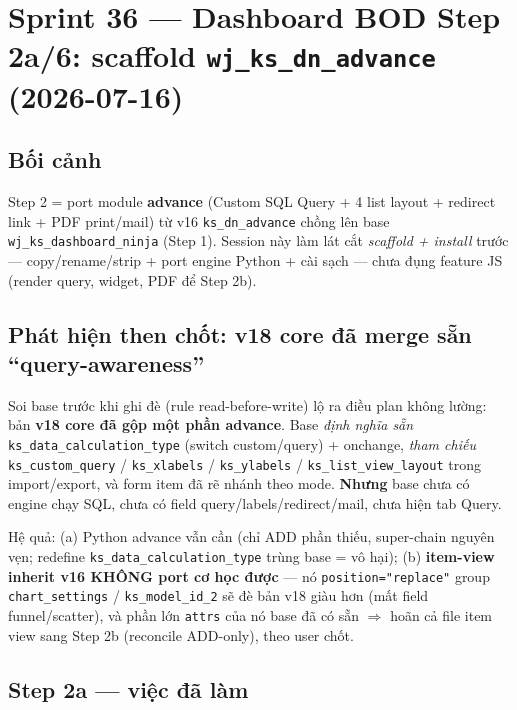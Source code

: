 \chapter{Sprint 36 --- Dashboard BOD Step 2a/6: scaffold \texttt{wj\_ks\_dn\_advance} (2026-07-16)}

\section{Bối cảnh}

Step 2 = port module \textbf{advance} (Custom SQL Query + 4 list layout + redirect link +
PDF print/mail) từ v16 \texttt{ks\_dn\_advance} chồng lên base \texttt{wj\_ks\_dashboard\_ninja}
(Step 1). Session này làm lát cắt \emph{scaffold + install} trước --- copy/rename/strip +
port engine Python + cài sạch --- chưa đụng feature JS (render query, widget, PDF để Step 2b).

\section{Phát hiện then chốt: v18 core đã merge sẵn ``query-awareness''}

Soi base trước khi ghi đè (rule read-before-write) lộ ra điều plan không lường: bản
\textbf{v18 core đã gộp một phần advance}. Base \emph{định nghĩa sẵn}
\texttt{ks\_data\_calculation\_type} (switch custom/query) + onchange, \emph{tham chiếu}
\texttt{ks\_custom\_query} / \texttt{ks\_xlabels} / \texttt{ks\_ylabels} /
\texttt{ks\_list\_view\_layout} trong import/export, và form item đã rẽ nhánh theo mode.
\textbf{Nhưng} base chưa có engine chạy SQL, chưa có field query/labels/redirect/mail,
chưa hiện tab Query.

Hệ quả: (a) Python advance vẫn cần (chỉ ADD phần thiếu, super-chain nguyên vẹn; redefine
\texttt{ks\_data\_calculation\_type} trùng base = vô hại); (b) \textbf{item-view inherit v16
KHÔNG port cơ học được} --- nó \texttt{position="replace"} group \texttt{chart\_settings} /
\texttt{ks\_model\_id\_2} sẽ đè bản v18 giàu hơn (mất field funnel/scatter), và phần lớn
\texttt{attrs} của nó base đã có sẵn $\Rightarrow$ hoãn cả file item view sang Step 2b
(reconcile ADD-only), theo user chốt.

\section{Step 2a --- việc đã làm}

